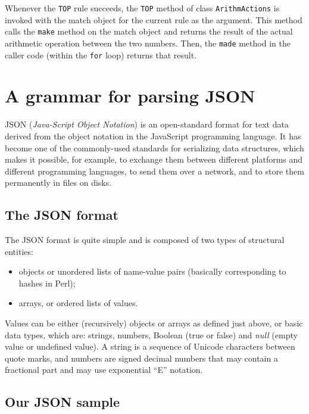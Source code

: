 Whenever the {\tt TOP} rule succeeds, the {\tt TOP} method 
of class {\tt ArithmActions} is invoked with the match 
object for the current rule as the argument.  This method 
calls the {\tt make} method on the match object and 
returns the result of the actual arithmetic operation 
between the two numbers. Then, the {\tt made} method 
in the caller code (within the {\tt for} loop) returns 
that result.

\section{A grammar for parsing JSON}

JSON (\emph{Java-Script Object Notation}) is an 
open-standard format for text data derived from 
the object notation in the JavaScript programming language. 
It has become one of the commonly-used standards for 
serializing data structures, which makes it possible, for 
example, to exchange them between different platforms and 
different programming languages, to send them over a network, 
and to store them permanently in files on disks.

\subsection{The JSON format}

The JSON format is quite simple and is composed of two types 
of structural entities:
\begin{itemize}
\item objects or unordered lists of name-value pairs 
(basically corresponding to hashes in Perl);
\item arrays, or ordered lists of values.
\end{itemize}

Values can be either (recursively) objects or arrays 
as defined just above, or basic data types, which are: 
strings, numbers, Boolean (true or false) and \emph{null} 
(empty value or undefined value). A string is a sequence 
of Unicode characters between quote marks, and numbers 
are signed decimal numbers that may contain a fractional 
part and may use exponential ``E'' notation.

\subsection{Our JSON sample}

